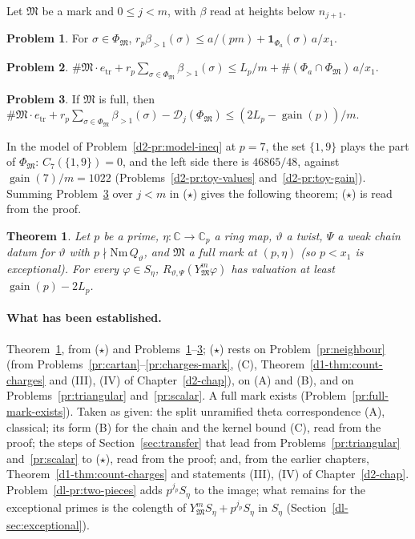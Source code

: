 \documentclass[reqno]{amsart}
\newcounter{chap}
\theoremstyle{plain}
\newtheorem{theorem}{Theorem}[section]
\theoremstyle{definition}
\newtheorem{problem}{Problem}[section]
\theoremstyle{remark}
\newcommand{\C}{\mathbb{C}}
\newcommand{\Dc}{\mathcal D}
\newcommand{\Mk}{\mathfrak M}
\newcommand{\gain}{\operatorname{gain}}
\newcommand{\bl}{\beta_{>1}}
\newcommand{\tr}{e_{\mathrm{tr}}}
\begin{document}
Let \(\Mk\) be a mark and \(0 \le j < m\), with \(\beta\) read at heights below \(n_{j+1}\).

\begin{problem}\label{pr:low-columns}
For \(\sigma \in \Phi_{\Mk}\), \(r_p\bl(\sigma) \le a/(pm) + \mathbf 1_{\Phi_a}(\sigma)\,a/x_1\).
\end{problem}

\begin{problem}\label{pr:transfer-paid}
\(\#\Mk \cdot \tr + r_p \sum_{\sigma \in \Phi_{\Mk}} \bl(\sigma) \le L_p/m + \#(\Phi_a \cap \Phi_{\Mk})\, a/x_1\).
\end{problem}

\begin{problem}\label{pr:stage-cost}
If \(\Mk\) is full, then \(\#\Mk\cdot\tr + r_p\sum_{\sigma \in \Phi_{\Mk}}\bl(\sigma) - \Dc_j(\Phi_{\Mk}) \le (2L_p - \gain(p))/m\).
\end{problem}

In the model of Problem~\ref{d2-pr:model-ineq} at \(p = 7\), the set \(\{1, 9\}\) plays the part of \(\Phi_{\Mk}\): \(C_7(\{1, 9\}) = 0\), and the left side there is \(46865/48\), against \(\gain(7)/m = 1022\) (Problems~\ref{d2-pr:toy-values} and~\ref{d2-pr:toy-gain}).  Summing Problem~\ref{pr:stage-cost} over \(j < m\) in (\(\star\)) gives the following theorem; (\(\star\)) is read from the proof.

\begin{theorem}\label{thm:full-mark}
Let \(p\) be a prime, \(\eta\colon \C \to \C_p\) a ring map, \(\vartheta\) a twist, \(\Psi\) a weak chain datum for \(\vartheta\) with \(p \nmid \mathrm{Nm}\,Q_\vartheta\), and \(\Mk\) a full mark at \((p, \eta)\) (so \(p < x_1\) is exceptional).  For every \(\varphi \in S_\eta\), \(R_{\vartheta,\Psi}(Y_{\Mk}^m\varphi)\) has valuation at least \(\gain(p) - 2L_p\).
\end{theorem}

\paragraph{What has been established.}  Theorem~\ref{thm:full-mark}, from (\(\star\)) and Problems~\ref{pr:low-columns}--\ref{pr:stage-cost}; (\(\star\)) rests on Problem~\ref{pr:neighbour} (from Problems~\ref{pr:cartan}--\ref{pr:charges-mark}, (C), Theorem~\ref{d1-thm:count-charges} and (III), (IV) of Chapter~\ref{d2-chap}), on (A) and (B), and on Problems~\ref{pr:triangular} and~\ref{pr:scalar}.  A full mark exists (Problem~\ref{pr:full-mark-exists}).  Taken as given: the split unramified theta correspondence (A), classical; its form (B) for the chain and the kernel bound (C), read from the proof; the steps of Section~\ref{sec:transfer} that lead from Problems~\ref{pr:triangular} and~\ref{pr:scalar} to (\(\star\)), read from the proof; and, from the earlier chapters, Theorem~\ref{d1-thm:count-charges} and statements (III), (IV) of Chapter~\ref{d2-chap}.  Problem~\ref{dl-pr:two-pieces} adds \(p^{j_p}S_\eta\) to the image; what remains for the exceptional primes is the colength of \(Y_{\Mk}^mS_\eta + p^{j_p}S_\eta\) in \(S_\eta\) (Section~\ref{dl-sec:exceptional}).
\end{document}
